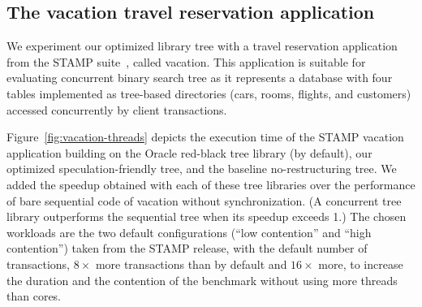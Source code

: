 \subsection{The vacation travel reservation application}

We experiment our optimized library tree with a travel reservation application 
from the STAMP suite~\cite{CCKO08}, called vacation.
This application is suitable for evaluating concurrent binary search tree as it 
represents a database with four tables implemented as tree-based directories (cars, rooms, 
flights, and customers) accessed concurrently by client transactions. 

Figure~\ref{fig:vacation-threads} depicts the execution time of the STAMP vacation application
building on the Oracle red-black tree library (by default), 
our optimized speculation-friendly tree, 
and the baseline no-restructuring tree. 
We added the speedup obtained with each of these tree libraries over the performance of bare sequential code of vacation without synchronization.
(A concurrent tree library outperforms the sequential tree when its speedup exceeds 1.)
The chosen workloads are the two default configurations (``low contention'' and ``high contention'') 
taken from the STAMP release, with the default number of transactions, $8\times$ more transactions than by default and $16\times$ 
more, to increase the duration and the contention of the benchmark without using more threads than cores.

